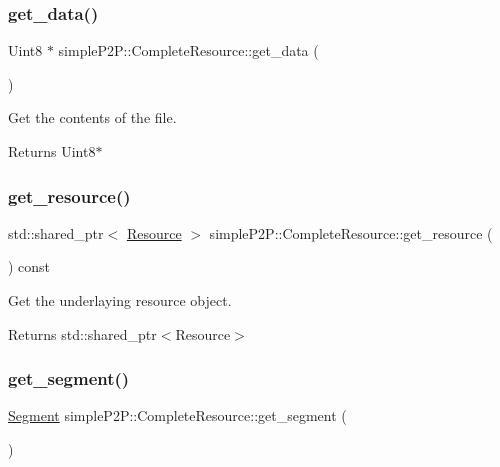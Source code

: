 \subsubsection{\texorpdfstring{get\+\_\+data()}{get\_data()}}
{\footnotesize\ttfamily Uint8 $\ast$ simple\+P2\+P\+::\+Complete\+Resource\+::get\+\_\+data (\begin{DoxyParamCaption}{ }\end{DoxyParamCaption})}



Get the contents of the file. 

\begin{DoxyReturn}{Returns}
Uint8$\ast$ 
\end{DoxyReturn}
\mbox{\label{classsimpleP2P_1_1CompleteResource_ac31825cc3bed61d181456430db3878f4}} 
\subsubsection{\texorpdfstring{get\+\_\+resource()}{get\_resource()}}
{\footnotesize\ttfamily std\+::shared\+\_\+ptr$<$ \hyperlink{classsimpleP2P_1_1Resource}{Resource} $>$ simple\+P2\+P\+::\+Complete\+Resource\+::get\+\_\+resource (\begin{DoxyParamCaption}{ }\end{DoxyParamCaption}) const}



Get the underlaying resource object. 

\begin{DoxyReturn}{Returns}
std\+::shared\+\_\+ptr$<$\+Resource$>$ 
\end{DoxyReturn}
\mbox{\label{classsimpleP2P_1_1CompleteResource_aabe86fbdc8daab23c1df0bc2abb91e7d}} 
\subsubsection{\texorpdfstring{get\+\_\+segment()}{get\_segment()}}
{\footnotesize\ttfamily \hyperlink{classsimpleP2P_1_1Segment}{Segment} simple\+P2\+P\+::\+Complete\+Resource\+::get\+\_\+segment (\begin{DoxyParamCaption}{ }\end{DoxyParamCaption})}



